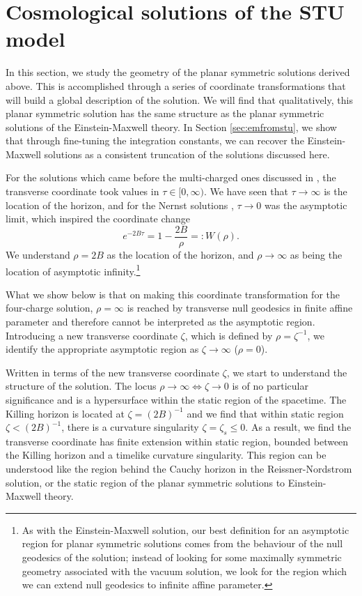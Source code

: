 \section{Cosmological solutions of the STU model}
\label{sec:cosmologicalsolutionstu}
In this section, we study the geometry of the planar symmetric solutions derived above. This is accomplished through a series of coordinate transformations that will build a global description of the solution. We will find that qualitatively, this planar symmetric solution has the same structure as the planar symmetric solutions of the Einstein-Maxwell theory. In Section \ref{sec:emfromstu}, we show that through fine-tuning the integration constants, we can recover the Einstein-Maxwell solutions as a consistent truncation of the solutions discussed here.

For the solutions which came before the multi-charged ones discussed in \cite{Gutowski:2019iyo}, the transverse coordinate took values in $\tau \in [0, \infty)$. We have seen that $\tau \rightarrow \infty$ is the location of the horizon, and for the Nernst solutions \cite{Dempster:2015}, $\tau \rightarrow 0$ was the asymptotic limit, which inspired the coordinate change
	\begin{equation}
	\label{eq:cchange}
	e^{-2B\tau} = 1 - \frac{2B}{\rho} =: W(\rho).
	\end{equation}
	We understand $\rho = 2B$ as the location of the horizon, and $\rho \rightarrow \infty$ as being the location of asymptotic infinity.\footnote{As with the Einstein-Maxwell solution, our best definition for an asymptotic region for planar symmetric solutions comes from the behaviour of the null geodesics of the solution; instead of looking for some maximally symmetric geometry associated with the vacuum solution, we look for the region which we can extend null geodesics to infinite affine parameter.}
	
	What we show below is that on making this coordinate transformation for the four-charge solution, $\rho=\infty$ is reached by transverse null geodesics in finite affine parameter and therefore cannot be interpreted as the asymptotic region. Introducing a new transverse coordinate $\zeta$, which is defined by $\rho = \zeta^{-1}$, we identify the appropriate asymptotic region as $\zeta \rightarrow \infty$ ($\rho = 0$). 
	
	Written in terms of the new transverse coordinate $\zeta$, we start to understand the structure of the solution. The locus $\rho \rightarrow \infty \Leftrightarrow \zeta \rightarrow 0$ is of no particular significance and is a hypersurface within the static region of the spacetime. The Killing horizon is located at $\zeta=(2B)^{-1}$ and we find that within static region $\zeta < (2B)^{-1}$, there is a curvature singularity $\zeta = \zeta_s \leq 0$. As a result, we find the transverse coordinate has finite extension within static region, bounded between the Killing horizon and a timelike curvature singularity. This region can be understood like the region behind the Cauchy horizon in the Reissner-Nordstrom solution, or the static region of the planar symmetric solutions to Einstein-Maxwell theory.
	
